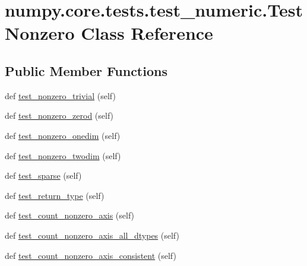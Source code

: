 \hypertarget{classnumpy_1_1core_1_1tests_1_1test__numeric_1_1TestNonzero}{}\section{numpy.\+core.\+tests.\+test\+\_\+numeric.\+Test\+Nonzero Class Reference}
\label{classnumpy_1_1core_1_1tests_1_1test__numeric_1_1TestNonzero}
\subsection*{Public Member Functions}
\begin{DoxyCompactItemize}
\item 
def \hyperlink{classnumpy_1_1core_1_1tests_1_1test__numeric_1_1TestNonzero_a77928fba0b0d292c208fc426e9f5dba2}{test\+\_\+nonzero\+\_\+trivial} (self)
\item 
def \hyperlink{classnumpy_1_1core_1_1tests_1_1test__numeric_1_1TestNonzero_a4a8be845d0632b2db7ee57589a61e16c}{test\+\_\+nonzero\+\_\+zerod} (self)
\item 
def \hyperlink{classnumpy_1_1core_1_1tests_1_1test__numeric_1_1TestNonzero_a709f88fb97e6f41119a45b9714f9b055}{test\+\_\+nonzero\+\_\+onedim} (self)
\item 
def \hyperlink{classnumpy_1_1core_1_1tests_1_1test__numeric_1_1TestNonzero_adf65f601161f1c13ef031d2001bad335}{test\+\_\+nonzero\+\_\+twodim} (self)
\item 
def \hyperlink{classnumpy_1_1core_1_1tests_1_1test__numeric_1_1TestNonzero_a9718a81e123db7826ee715e6cb7a2d51}{test\+\_\+sparse} (self)
\item 
def \hyperlink{classnumpy_1_1core_1_1tests_1_1test__numeric_1_1TestNonzero_ad8d124d40018de70ded53250c2dd72d1}{test\+\_\+return\+\_\+type} (self)
\item 
def \hyperlink{classnumpy_1_1core_1_1tests_1_1test__numeric_1_1TestNonzero_a84b8844653db7712c57e5e79d12d541b}{test\+\_\+count\+\_\+nonzero\+\_\+axis} (self)
\item 
def \hyperlink{classnumpy_1_1core_1_1tests_1_1test__numeric_1_1TestNonzero_ab5773e7657f2082744f1a7b484b3db3c}{test\+\_\+count\+\_\+nonzero\+\_\+axis\+\_\+all\+\_\+dtypes} (self)
\item 
def \hyperlink{classnumpy_1_1core_1_1tests_1_1test__numeric_1_1TestNonzero_ae3349c30f8caaf37f6d4d0b390f06073}{test\+\_\+count\+\_\+nonzero\+\_\+axis\+\_\+consistent} (self)
\item 

\end{DoxyCompactItemize}

